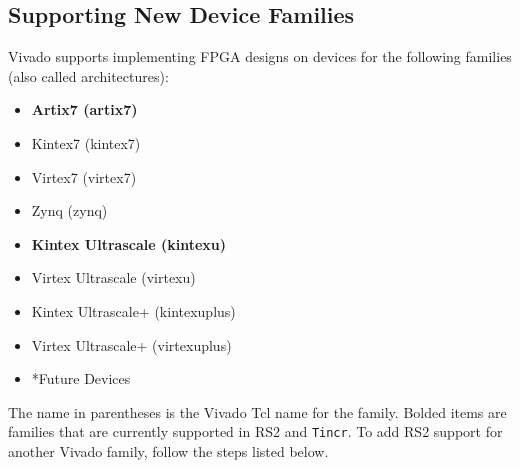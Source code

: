 \subsection{Supporting New Device Families} \label{sec:newFamilies}
Vivado supports implementing FPGA designs on devices for the following families
(also called architectures):

\begin{multicols}{2}
	\begin {itemize}
	  \item \textbf{Artix7 (artix7)}
	  \item Kintex7 (kintex7)
	  \item Virtex7 (virtex7)
	  \item Zynq (zynq)
	  \item \textbf{Kintex Ultrascale (kintexu)}
	  \item Virtex Ultrascale (virtexu)
	  \item Kintex Ultrascale+ (kintexuplus)
	  \item Virtex Ultrascale+ (virtexuplus)
	  \item *Future Devices
	\end{itemize}
\end{multicols}

\noindent The name in parentheses is the Vivado Tcl name for the family. Bolded
items are families that are currently supported in RS2 and
\texttt{Tincr}. To add RS2 support for another Vivado family, follow the
steps listed below.

